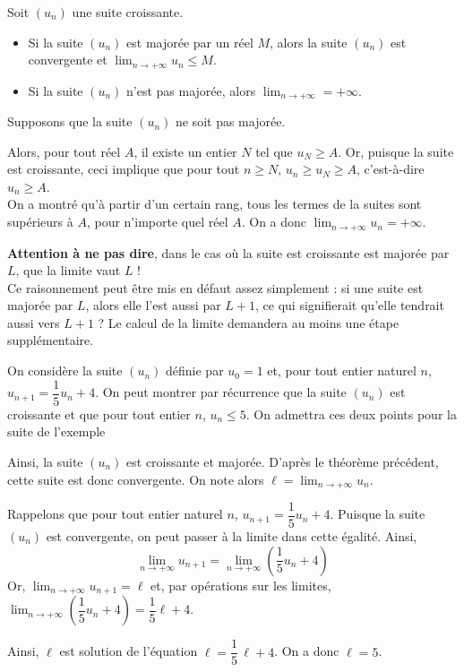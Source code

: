 \documentclass[11pt,fleqn, openany]{book} %
\begin{document}
\begin{theorem} Soit $(u_n)$ une suite croissante.
\begin{itemize}
\item Si la suite $(u_n)$ est majorée par un réel $M$, alors la suite $(u_n)$ est convergente et $\displaystyle \lim_{n \to +\infty} u_n \leqslant M$.
\item Si la suite $(u_n)$ n'est pas majorée, alors $\displaystyle \lim_{n \to +\infty} = +\infty$.
\end{itemize} \end{theorem}


\begin{demonstration} Supposons que la suite $(u_n)$ ne soit pas majorée. 

Alors, pour tout réel $A$, il existe un entier $N$ tel que $u_N \geqslant A$. Or, puisque la suite est croissante, ceci implique que pour tout $n\geqslant N$, $u_n \geqslant u_N \geqslant A$, c'est-à-dire $u_n \geqslant A$.\\
On a montré qu'à partir d'un certain rang, tous les termes de la suites sont supérieurs à $A$, pour n'importe quel réel $A$. On a donc $\displaystyle \lim_{n \to +\infty} u_n = +\infty$.\end{demonstration}


\textbf{Attention à ne pas dire}, dans le cas où la suite est croissante est majorée par $L$, que la limite vaut $L$ ! \\
Ce raisonnement peut être mis en défaut assez simplement : si une suite est majorée par $L$, alors elle l'est aussi par $L+1$, ce qui signifierait qu'elle tendrait aussi vers $L+1$ ? Le calcul de la limite demandera au moins une étape supplémentaire.


\begin{example} On considère la suite $(u_n)$ définie par $u_0=1$ et, pour tout entier naturel $n$, $u_{n+1}=\dfrac{1}{5}u_n+4$. On peut montrer par récurrence que la suite $(u_n)$ est croissante et que pour tout entier $n$, $u_n \leqslant 5$. On admettra ces deux points pour la suite de l'exemple

Ainsi, la suite $(u_n)$ est croissante et majorée. D'après le théorème précédent, cette suite est donc convergente. On note alors $\ell =\displaystyle \lim_{n \to +\infty} u_n$.

Rappelons que pour tout entier naturel $n$, $u_{n+1}=\dfrac{1}{5}u_n+4$. Puisque la suite $(u_n)$ est convergente, on peut passer à la limite dans cette égalité. Ainsi,
\[\displaystyle \lim_{n \to +\infty} u_{n+1} =\displaystyle \lim_{n \to +\infty} \left( \dfrac{1}{5}u_n + 4\right)\]
Or, $\displaystyle \lim_{n \to +\infty} u_{n+1}=\ell$ et, par opérations sur les limites, $\displaystyle \lim_{n \to +\infty} \left( \dfrac{1}{5}u_n+4\right) = \dfrac{1}{5}\ell+4$.

Ainsi, $\ell$ est solution de l'équation $\ell=\dfrac{1}{5}\, \ell+4$. On a donc $\ell=5$.\end{example}
\end{document}
